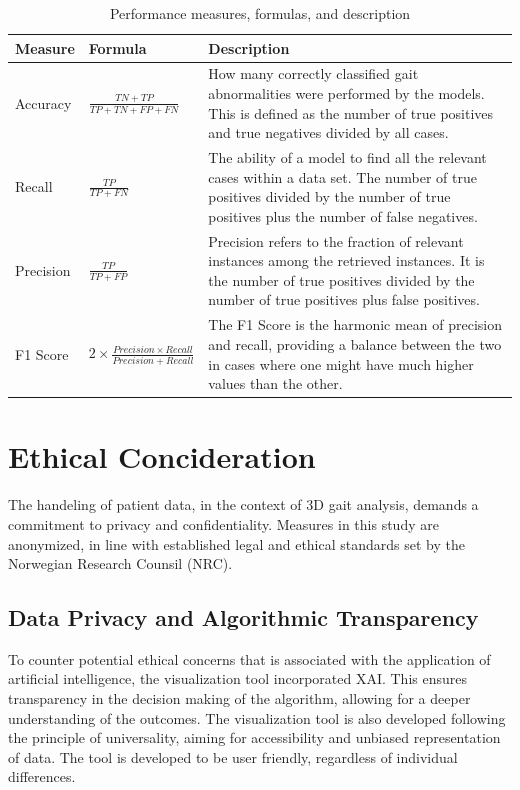 \documentclass[UKenglish]{uiomasterthesis}
\begin{document}
\begin{table}[!ht]
\centering
\begin{tabularx}{\textwidth}{>{\hsize=0.5\hsize}X>{\hsize=0.9\hsize}X>{\hsize=1.7\hsize}X}
\toprule
\textbf{Measure} & \textbf{Formula} & \textbf{Description} \\
\midrule
Accuracy & \(\frac{TN+TP}{TP+TN+FP+FN}\) & How many correctly classified gait abnormalities were performed by the models. This is defined as the number of true positives and true negatives divided by all cases.\\
\midrule
Recall & \(\frac{TP}{TP+FN}\) & The ability of a model to find all the relevant cases within a data set. The number of true positives divided by the number of true positives plus the number of false negatives.\\
\midrule
Precision & \(\frac{TP}{TP+FP}\) & Precision refers to the fraction of relevant instances among the retrieved instances. It is the number of true positives divided by the number of true positives plus false positives.\\
\midrule
F1 Score & \(2 \times \frac{Precision \times Recall}{Precision + Recall}\) & The F1 Score is the harmonic mean of precision and recall, providing a balance between the two in cases where one might have much higher values than the other.\\
\bottomrule
\end{tabularx}
\caption{Performance measures, formulas, and description}
\label{table1}
\end{table}

\newpage
\section{Ethical Concideration}
The handeling of patient data, in the context of 3D gait analysis, demands a commitment to privacy and confidentiality. Measures in this study are anonymized, in line with established legal and ethical standards set by the Norwegian Research Counsil (NRC). 

\subsection{Data Privacy and Algorithmic Transparency}

To counter potential ethical concerns that is associated with the application of artificial intelligence, the visualization tool incorporated XAI. This ensures transparency in the decision making of the algorithm, allowing for a deeper understanding of the outcomes. The visualization tool is also developed following the principle of universality, aiming for accessibility and unbiased representation of data. The tool is developed to be user friendly, regardless of individual differences.
\end{document}
